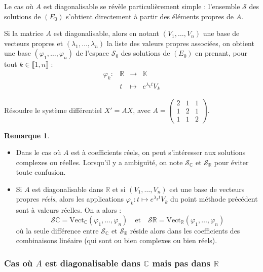 \documentclass[french]{article}
\newcommand{\R}{\mathbb{R}}
\newcommand{\C}{\mathbb{C}}
\newcommand{\K}{\mathbb{K}}
\newcommand{\Vect}{\text{Vect}}
\theoremstyle{plain}
\theoremstyle{definition}
\newtheorem*{rmq}{Remarque}
\theoremstyle{remark}
\begin{document}
Le cas où $A$ est diagonalisable se révèle particulièrement simple : l'ensemble $\mathcal{S}$ des solutions de $(E_0)$ s'obtient directement à partir des éléments propres de $A$.

\begin{met}
	Si la matrice $A$ est diagonalisable, alors en notant $(V_1,\ldots,V_n)$ une base de vecteurs propres et $(\lambda_1,\ldots,\lambda_n)$ la liste des valeurs propres associées, on obtient une base $(\varphi_1,\ldots,\varphi_n)$ de l'espace $\mathcal{S}_0$ des solutions de $(E_0)$ en prenant, pour tout $k\in\llbracket1,n\rrbracket$ : $$\begin{array}{lrcl}
		\varphi_k:&\R&\longrightarrow&\K \\
		&t&\longmapsto&e^{\lambda_k t}V_k
	\end{array}$$
\end{met}

\begin{exo}
	Résoudre le système différentiel $X'=AX$, avec $A=\begin{pmatrix}
		2&1&1\\
		1&2&1\\
		1&1&2
	\end{pmatrix}$.
\end{exo}

\begin{rmq}
	\begin{itemize}
		\item Dans le cas où $A$ est à coefficients réels, on peut s'intéresser aux solutions complexes ou réelles. Lorsqu'il y a ambiguïté, on note $\mathcal{S}_\C$ et $\mathcal{S}_\R$ pour éviter toute confusion.
		\item Si $A$ est diagonalisable dans $\R$ et si $(V_1,\ldots,V_n)$ est une base de vecteurs propres \textit{réels}, alors les applications $\varphi_k:t\mapsto e^{\lambda_k t}V_k$ du point méthode précédent sont à valeurs réelles. On a alors :
		$$\mathcal{S}\C=\Vect_\C(\varphi_1,\ldots,\varphi_n)\quad\text{et}\quad\mathcal{S}\R=\Vect_\R(\varphi_1,\ldots,\varphi_n)$$ où la seule différence entre $\mathcal{S}_\C$ et $\mathcal{S}_\R$ réside alors dans les coefficients des combinaisons linéaire (qui sont ou bien complexes ou bien réels).
	\end{itemize}
\end{rmq}

\subsubsection*{Cas où $A$ est diagonalisable dans $\C$ mais pas dans $\R$}
\end{document}
